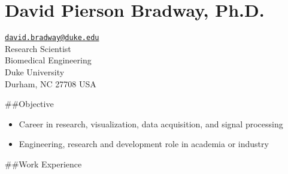 \documentclass[
]{article}
\author{}
\date{}
\providecommand{\tightlist}{%
  \setlength{\itemsep}{0pt}\setlength{\parskip}{0pt}}
\begin{document}
\hypertarget{david-pierson-bradway-ph.d.}{%
\section{David Pierson Bradway,
Ph.D.~}\label{david-pierson-bradway-ph.d.}}

\href{mailto:david.bradway@duke.edu}{\nolinkurl{david.bradway@duke.edu}}\\
Research Scientist\\
Biomedical Engineering\\
Duke University\\
Durham, NC 27708 USA

\#\#Objective

\begin{itemize}
\tightlist
\item
  Career in research, visualization, data acquisition, and signal
  processing
\item
  Engineering, research and development role in academia or industry
\end{itemize}

\#\#Work Experience
\end{document}

